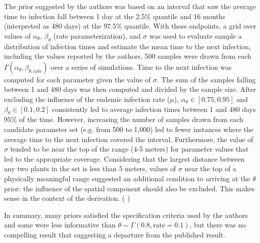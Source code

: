 \documentclass{uwstat572}
\newcommand{\vmcomment}[1]{({\color{blue}{VM's comment:}} \textbf{\color{blue}{#1}})}
\begin{document}
The prior suggested by the authors was based on an interval that saw the average time to infection fall between 1 day at the 2.5\% quantile and 16 months (interpreted as 480 days) at the 97.5\% quantile. 
With these endpoints, a grid over values of $\alpha_{\theta}$, $\beta_{\theta}$ (rate parameterization), and $\sigma$ was used to evaluate sample a distribution of infection times and estimate the mean time to the next infection, including the values reported by the authors. 
500 samples were drawn from each $\Gamma(\alpha_{\theta}, \beta_{\theta, \text{rate}})$ over a series of simulations. 
Time to the next infection was computed for each parameter given the value of $\sigma$. 
The sum of the samples falling between 1 and 480 days was then computed and divided by the sample size. 
After excluding the influence of the endemic infection rate ($\mu$), $\alpha_{\theta} \in [0.75, 0.95]$ and $\beta_{\theta} \in [0.1, 0.2]$  consistently led to average infection times between 1 and 480 days 95\% of the time.  
However, increasing the number of samples drawn from each candidate parameter set (e.g. from 500 to 1,000) led to fewer instances where the average time to the next infection covered the interval. 
Furthermore, the value of $\sigma$ tended to be near the top of the range (4-5 meters) for parameter values that led to the appropriate coverage. 
Considering that the largest distance between any two plants in the set is less than 5 meters, values of $\sigma$ near the top of a physically meaningful range suggested an additional condition to arriving at the $\theta$ prior: the influence of the spatial component should also be excluded. 
This makes sense in the context of the derivation. 
\vmcomment{You use too much passive voice. Try to mix it up more, if not remove passive voice almost entirely.}

In summary, many priors satisfied the specification criteria used by the authors and some were less informative than $\theta \sim \Gamma(0.8, \text{rate}=0.1)$, but there was no compelling result that suggesting a departure from the published result. 
\end{document}
